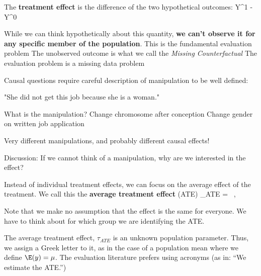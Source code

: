 \documentclass[
  25pt,         %
  a4paper,
  landscape,
  Screen4to3,
  footrule ]{foils}
\begin{document}

\bi

\x The \textbf{treatment effect} is the difference of the two
hypothetical outcomes: \vsm
    \bdm
    Y^1 - Y^0
    \edm

\vsm

\x While we can think hypothetically about this quantity, \textbf{we can't
observe it for any specific member of the population}.
\vsm
\x This is the fundamental evaluation problem 
\vsm
\x The unobserved outcome is what we call the \textit{Missing Counterfactual}
\vsm
\x The evaluation problem is a missing data problem

\ei


Causal questions require careful description of manipulation to be well defined:

"She did not get this job because she is a woman."

What is the manipulation?
\vsm
\bi 
\x Change chromosome after conception
\vsm
\x Change gender on written job application
\ei

Very different manipulations, and probably different causal effects!

Discussion: If we cannot think of a manipulation, why are we interested in the effect?


\bi

\x Instead of individual treatment effects, we can focus on the average effect of the
treatment.
\x We call this the \textbf{average treatment effect} (ATE)
\vsm
    \bdm
    \tau_{ATE} = \E[Y^1 - Y^0] \, ,
    \edm

\vsm \vsm

\x Note that we make no assumption that the effect is the same for everyone.
 \vsm
\x We have to think about for which group we are identifying the ATE. 

\ei



\bi

\x The average treatment effect, $\tau_{ATE}$ is an unknown
population parameter. Thus, we assign a Greek letter to it, as in
the case of a population mean where we define $\E(y)=\mu$. The
evaluation literature prefers using acronyms (as in: ``We estimate
the ATE.'')
\end{document}
